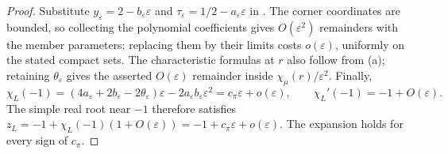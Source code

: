 \documentclass[11pt]{article}
\theoremstyle{definition}
\theoremstyle{remark}
\newcommand{\cpi}{c_{\pi}}
\begin{document}
\begin{proof}
Substitute \(y_\varepsilon=2-b_\varepsilon\varepsilon\) and
\(\tau_\varepsilon=1/2-a_\varepsilon\varepsilon\) in .
The corner coordinates are bounded, so collecting the polynomial coefficients gives
\(O(\varepsilon^2)\) remainders with the member parameters;
replacing them by their limits costs \(o(\varepsilon)\), uniformly on the stated compact sets.
The characteristic formulas at \(r\) also follow from (a);
retaining \(\theta_\varepsilon\) gives the asserted \(O(\varepsilon)\) remainder inside
\(\chi_\mu(r)/\varepsilon^2\).
Finally,
\[
\chi_L(-1)=(4a_\varepsilon+2b_\varepsilon-2\theta_\varepsilon)\varepsilon
-2a_\varepsilon b_\varepsilon\varepsilon^2
=\cpi\varepsilon+o(\varepsilon),\qquad
\chi_L'(-1)=-1+O(\varepsilon).
\]
The simple real root near \(-1\) therefore satisfies
\(z_L=-1+\chi_L(-1)(1+O(\varepsilon))=-1+\cpi\varepsilon+o(\varepsilon)\).
The expansion holds for every sign of \(\cpi\).
\end{proof}
\end{document}
